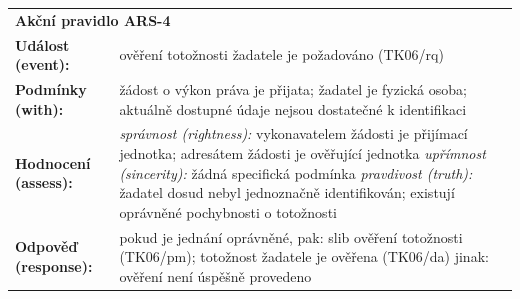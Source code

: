 \begin{itemize}
    \begin{center}
      \renewcommand{\arraystretch}{1.3}
      \begin{tabular}{p{4cm} p{8cm}}
      \multicolumn{2}{l}{\textbf{Akční pravidlo ARS-4}} \\
      \textbf{Událost (event):} & ověření totožnosti žadatele je požadováno (TK06/rq) \\
      \textbf{Podmínky (with):} & 
        žádost o výkon práva je přijata; \newline
        žadatel je fyzická osoba; \newline
        aktuálně dostupné údaje nejsou dostatečné k identifikaci \\
      \textbf{Hodnocení (assess):} & 
        \textit{správnost (rightness):} \newline
        \quad vykonavatelem žádosti je přijímací jednotka; \newline
        \quad adresátem žádosti je ověřující jednotka \newline
        \textit{upřímnost (sincerity):} \newline
        \quad žádná specifická podmínka \newline
        \textit{pravdivost (truth):} \newline
        \quad žadatel dosud nebyl jednoznačně identifikován; \newline
        \quad existují oprávněné pochybnosti o totožnosti \\
      \textbf{Odpověď (response):} & 
        pokud je jednání oprávněné, pak: \newline
        \quad slib ověření totožnosti (TK06/pm); \newline
        \quad totožnost žadatele je ověřena (TK06/da) \newline
        jinak: \newline
        \quad ověření není úspěšně provedeno \\
      \end{tabular}
    \end{center}
      

\end{itemize}
